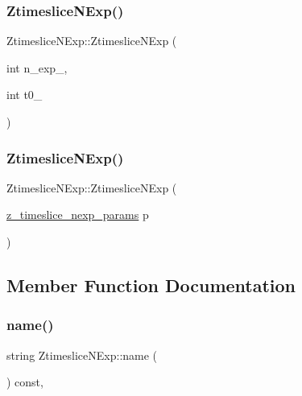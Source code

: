\subsubsection{\texorpdfstring{ZtimesliceNExp()}{ZtimesliceNExp()}\hspace{0.1cm}{\footnotesize\ttfamily [3/4]}}
{\footnotesize\ttfamily Ztimeslice\+N\+Exp\+::\+Ztimeslice\+N\+Exp (\begin{DoxyParamCaption}\item[{int}]{n\+\_\+exp\+\_\+,  }\item[{int}]{t0\+\_\+ }\end{DoxyParamCaption})}

\mbox{\label{classZtimesliceNExp_a75ae13f08fbe15143b9c75ed9c6f0c4e}} 
\subsubsection{\texorpdfstring{ZtimesliceNExp()}{ZtimesliceNExp()}\hspace{0.1cm}{\footnotesize\ttfamily [4/4]}}
{\footnotesize\ttfamily Ztimeslice\+N\+Exp\+::\+Ztimeslice\+N\+Exp (\begin{DoxyParamCaption}\item[{\mbox{\hyperlink{structz__timeslice__nexp__params}{z\+\_\+timeslice\+\_\+nexp\+\_\+params}}}]{p }\end{DoxyParamCaption})}



\subsection{Member Function Documentation}
\mbox{\label{classZtimesliceNExp_a012d885734f62a67b2d1ffc0d4128b0b}} 
\subsubsection{\texorpdfstring{name()}{name()}\hspace{0.1cm}{\footnotesize\ttfamily [1/2]}}
{\footnotesize\ttfamily string Ztimeslice\+N\+Exp\+::name (\begin{DoxyParamCaption}{ }\end{DoxyParamCaption}) const\hspace{0.3cm}{\ttfamily [inline]}, {\ttfamily [virtual]}}



